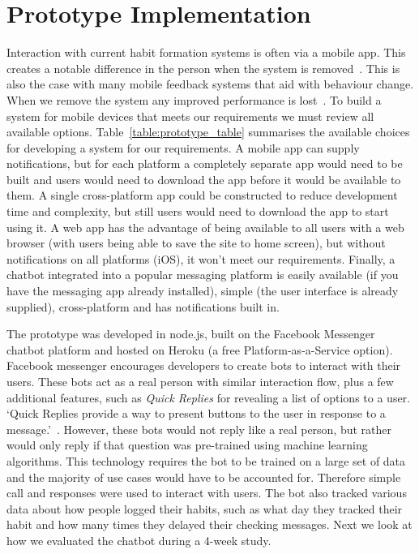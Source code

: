 
\section{Prototype Implementation}

Interaction with current habit formation systems is often via a mobile app. This creates a notable difference in the person when the system is removed~\cite{article_my_phone_is_part_of_my_soul}.
This is also the case with many mobile feedback systems that aid with behaviour change.
When we remove the system any improved performance is lost~\cite{article_dont_kick_habit, article_realtime_feedback_improving_medication_taking}. To build a system for mobile devices that meets our requirements we must review all available options.\newline
\newline
Table~\ref{table:prototype_table} summarises the available choices for developing a system for our requirements. A mobile app can supply notifications, but for each platform a completely separate app would need to be built and users would need to download the app before it would be available to them.\newline
A single cross-platform app could be constructed to reduce development time and complexity, but still users would need to download the app to start using it.\newline
A web app has the advantage of being available to all users with a web browser (with users being able to save the site to home screen), but without notifications on all platforms (iOS), it won't meet our requirements.\newline
Finally, a chatbot integrated into a popular messaging platform is easily available (if you have the messaging app already installed), simple (the user interface is already supplied), cross-platform and has notifications built in.


The prototype was developed in node.js, built on the Facebook Messenger chatbot platform and hosted on Heroku (a free Platform-as-a-Service option). Facebook messenger encourages developers to create bots to interact with their users. These bots act as a real person with similar interaction flow, plus a few additional features, such as \textit{Quick Replies} for revealing a list of options to a user. `Quick Replies provide a way to present buttons to the user in response to a message.'~\cite{doc_fb_quick_replies}. However, these bots would not reply like a real person, but rather would only reply if that question was pre-trained using machine learning algorithms. This technology requires the bot to be trained on a large set of data and the majority of use cases would have to be accounted for. Therefore simple call and responses were used to interact with users. The bot also tracked various data about how people logged their habits, such as what day they tracked their habit and how many times they delayed their checking messages. Next we look at how we evaluated the chatbot during a 4-week study.

